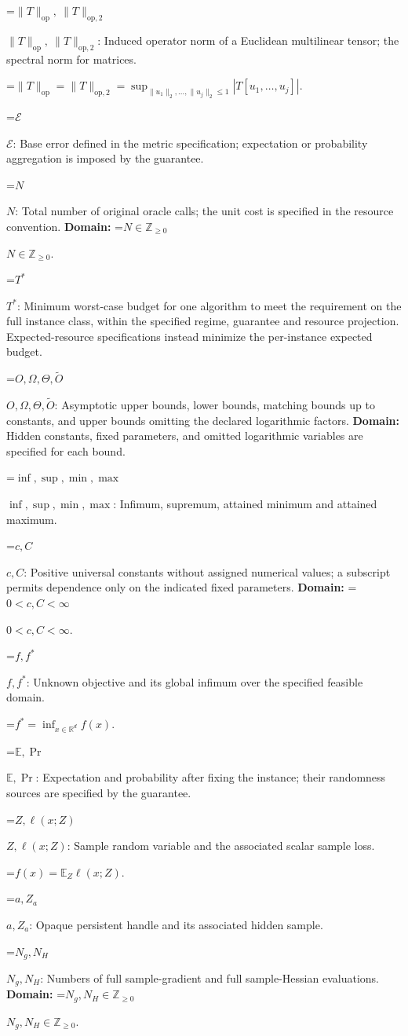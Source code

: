\documentclass[10pt,a4paper]{article}
\newcommand{\AtlasMath}[1]{\par\begingroup\centering\setbox0=\hbox{$\displaystyle #1$}\ifdim\wd0>1.4\linewidth\typeout{ATLAS WIDE FORMULA: \the\wd0}\fi\ifdim\wd0>\linewidth\resizebox{\linewidth}{!}{\box0}\else\box0\fi\par\endgroup}
\newcommand{\AtlasInlineMath}[1]{\begingroup\setbox0=\hbox{$#1$}\ifdim\wd0>.4\linewidth\endgroup\AtlasMath{#1}\else\endgroup$#1$\fi}
\begin{document}
\AtlasInlineMath{\|T\|_{\mathrm{op}},\ \|T\|_{\mathrm{op},2}}: Induced operator norm of a Euclidean multilinear tensor; the spectral norm for matrices.


\AtlasMath{\|T\|_{\mathrm{op}}=\|T\|_{\mathrm{op},2}=\sup_{\|u_1\|_2,\ldots,\|u_j\|_2\le1}|T[u_1,\ldots,u_j]|.}


\AtlasInlineMath{\mathcal{E}}: Base error defined in the metric specification; expectation or probability aggregation is imposed by the guarantee.

\AtlasInlineMath{N}: Total number of original oracle calls; the unit cost is specified in the resource convention. \textbf{Domain:} \AtlasInlineMath{N\in\mathbb{Z}_{\ge0}}.

\AtlasInlineMath{T^*}: Minimum worst-case budget for one algorithm to meet the requirement on the full instance class, within the specified regime, guarantee and resource projection. Expected-resource specifications instead minimize the per-instance expected budget.

\AtlasInlineMath{O,\Omega,\Theta,\widetilde{O}}: Asymptotic upper bounds, lower bounds, matching bounds up to constants, and upper bounds omitting the declared logarithmic factors. \textbf{Domain:} Hidden constants, fixed parameters, and omitted logarithmic variables are specified for each bound.

\AtlasInlineMath{\inf,\sup,\min,\max}: Infimum, supremum, attained minimum and attained maximum.

\AtlasInlineMath{c,C}: Positive universal constants without assigned numerical values; a subscript permits dependence only on the indicated fixed parameters. \textbf{Domain:} \AtlasInlineMath{0<c,C<\infty}.

\AtlasInlineMath{f,f^*}: Unknown objective and its global infimum over the specified feasible domain.


\AtlasMath{f^*=\inf_{x\in \mathbb{R}^d}f(x).}


\AtlasInlineMath{\mathbb{E},\Pr}: Expectation and probability after fixing the instance; their randomness sources are specified by the guarantee.

\AtlasInlineMath{Z,\ell(x;Z)}: Sample random variable and the associated scalar sample loss.


\AtlasMath{f(x)=\mathbb{E}_Z\ell(x;Z).}


\AtlasInlineMath{a,Z_a}: Opaque persistent handle and its associated hidden sample.

\AtlasInlineMath{N_g,N_H}: Numbers of full sample-gradient and full sample-Hessian evaluations. \textbf{Domain:} \AtlasInlineMath{N_g,N_H\in\mathbb{Z}_{\ge0}}.
\end{document}
